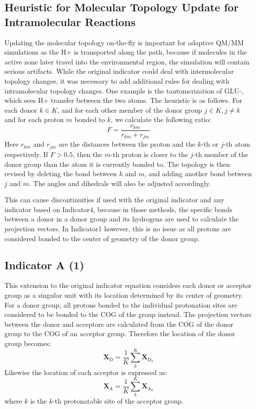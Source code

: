 \documentclass{article}
\newcommand{\mb}[1]{\mathbf{#1}}
\newcommand{\mr}[1]{\mathrm{#1}}
\begin{document}
\subsection{Heuristic for Molecular Topology Update for Intramolecular Reactions}\label{ss:topo_change}
Updating the molecular topology on-the-fly is important for adaptive QM/MM simulations as the H+ is transported along the path, because if molecules in the active zone later travel into the environmental region, the simulation will contain serious artifacts.
While the original indicator could deal with intermolecular topology changes, it was necessary to add additional rules for dealing with intramolecular topology changes.
One example is the tautomerization of GLU-, which sees H+ transfer between the two atoms.
The heuristic is as follows.
For each donor $k \in K$, and for each other member of the donor group $j \in K, j \ne k$ and for each proton $m$ bonded to $k$, we calculate the following ratio:
\begin{equation}
F = \frac{r_{km}}{r_{km} + r_{jm}}
\end{equation}
Here $r_{km}$ and $r_{jm}$ are the distances between the proton and the $k$-th or $j$-th atom respectively.
If $F > 0.5$, then the $m$-th proton is closer to the $j$-th member of the donor group than the atom it is currently bonded to.
The topology is then revised by deleting the bond between $k$ and $m$, and adding another bond between $j$ and $m$.
The angles and dihedrals will also be adjusted accordingly.

This can cause discontinuities if used with the original indicator and any indicator based on Indicator4, because in those methods, the specific bonds between a donor in a donor group and its hydrogens are used to calculate the projection vectors.
In Indicator1 however, this is no issue as all protons are considered bonded to the center of geometry of the donor group.

\subsection{Indicator A (1)}\label{ss:ind_a}
This extension to the original indicator equation considers each donor or acceptor group as a singular unit with its location determined by its center of geometry.
For a donor group, all protons bonded to the individual protonation sites are considered to be bonded to the COG of the group instead.
The projection vectors between the donor and acceptors are calculated from the COG of the donor group to the COG of an acceptor group.
Therefore the location of the donor group becomes:
\begin{equation}\label{eq:donor_cog}
\mb{X}_{\mr{D}} = \frac{1}{K}\sum_k^K \mb{X}_{\mr{D}_k}
\end{equation}
Likewise the location of each acceptor is expressed as:
\begin{equation}
\mb{X}_{\mr{A}} = \frac{1}{K}\sum_k^K \mb{X}_{\mr{A}_k}
\end{equation}
where $k$ is the $k$-th protonatable site of the acceptor group.
\end{document}
